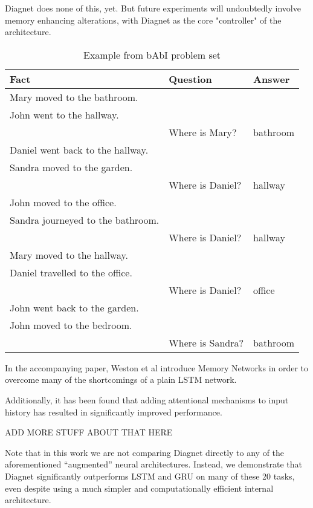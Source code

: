 \documentclass{article}
\begin{document}
Diagnet does none of this, yet. But future experiments will undoubtedly involve memory enhancing alterations, with Diagnet as the core "controller" of the architecture. 



\begin{table}
\caption{Example from bAbI problem set}
\centering
\begin{tabular}{|l|l|l|}
\hline
Fact & Question & Answer \\
\hline
Mary moved to the bathroom. & & \\
John went to the hallway. & & \\
 & Where is Mary? & bathroom \\
Daniel went back to the hallway. & & \\
Sandra moved to the garden. & & \\
 & Where is Daniel? & hallway \\
John moved to the office. & & \\
Sandra journeyed to the bathroom. & & \\
& Where is Daniel? & hallway \\
Mary moved to the hallway. & & \\
Daniel travelled to the office. & & \\
& Where is Daniel? & office \\
John went back to the garden. & & \\
John moved to the bedroom. & & \\
& Where is Sandra? & bathroom \\
\hline
\end{tabular}
\end{table}

In the accompanying paper, Weston et al introduce Memory Networks in order to overcome many of the shortcomings of a plain LSTM network. 

Additionally, it has been found that adding attentional mechanisms to input history has resulted in significantly improved performance.

ADD MORE STUFF ABOUT THAT HERE

Note that in this work we are not comparing Diagnet directly to any of the aforementioned “augmented” neural architectures. Instead, we demonstrate that Diagnet significantly outperforms LSTM and GRU on many of these 20 tasks, even despite using a much simpler and computationally efficient internal architecture.
\end{document}
